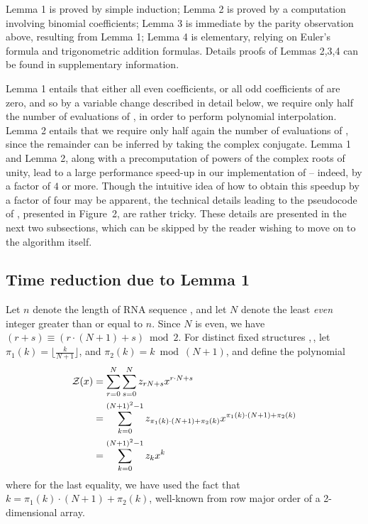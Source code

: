 Lemma 1 is proved by simple induction; Lemma 2
is proved by a computation involving binomial coefficients;
Lemma 3 is immediate
by the parity observation above, resulting from Lemma 1;
Lemma 4 is elementary, relying on Euler's
formula and trigonometric addition formulas. Details proofs of
Lemmas 2,3,4 can be found in supplementary information.

Lemma 1 entails that either all even coefficients, or all odd coefficients
of \emZ{} are zero, and so by a variable change described in detail below,
we require only half the number of evaluations of \emZ{}, in order to perform
polynomial interpolation.
Lemma 2 entails that we require only half again the number of evaluations of
\emZ{}, since the remainder can be inferred by taking the complex conjugate.
Lemma 1 and Lemma 2, along with a
precomputation of powers of the complex roots of unity, lead to a
large performance speed-up in our implementation of \ffttwo -- indeed,
by a factor of $4$ or more. Though the intuitive idea of how to obtain
this speedup by a factor of four may be apparent, the technical details
leading to the pseudocode of \ffttwo, presented in
Figure~2, are rather tricky. These details
are presented in the next two subsections, which can be skipped by the
reader wishing to move on to the algorithm itself.
\medskip

\subsection{Time reduction due to Lemma 1}
Let $n$ denote the length of RNA sequence \seq, and let $N$ denote the
least {\em even} integer greater than or equal to $n$. Since $N$ is even,
we have $(r+s) \equiv (r\cdot(N+1)+s) \bmod 2$. For distinct
fixed structures \strA,\,\strB, let
$\pi_1(k) = \lfloor \frac{k}{N+1} \rfloor$, and
$\pi_2(k) = k \bmod (N+1)$, and define the polynomial
\begin{align}
\label{eqn:polynomialPeter}
\emZ{} &= \sum_{r=0}^{N} \sum_{s=0}^{N} z_{rN+s} x^{r\cdot N + s}\\
&=
\sum_{k=0}^{(N+1)^2-1} z_{\pi_1(k)\cdot (N+1) + \pi_2(k)}
x^{\pi_1(k)\cdot (N+1) + \pi_2(k)}\\
&=
\sum_{k=0}^{(N+1)^2-1} z_k x^k
\end{align}
where for the last equality, we have used the fact that
$k = \pi_1(k)\cdot (N+1) + \pi_2(k)$, well-known from
row major order of a 2-dimensional array.


